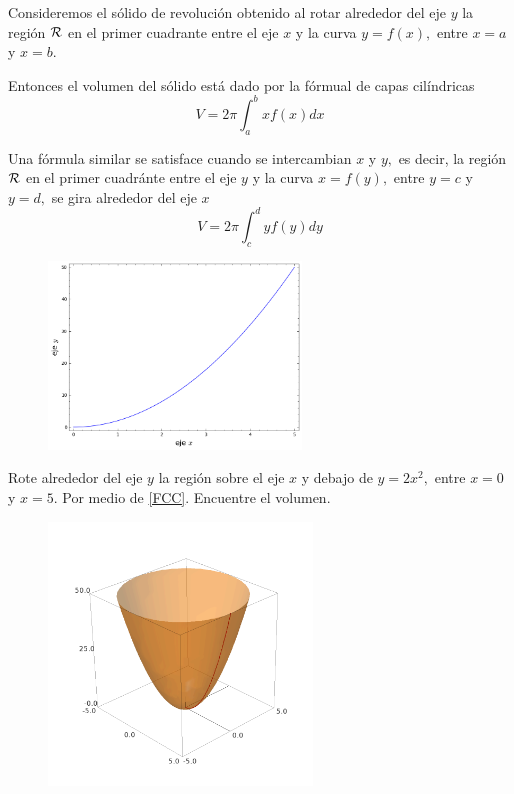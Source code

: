 Consideremos el s\'olido de revoluci\'on obtenido al rotar alrededor del eje $y$ la regi\'on $\mathcal{R}$ en el primer cuadrante entre el eje $x$ y la curva $y=f(x),$ entre $x=a$ y $x=b.$ 

Entonces el volumen del s\'olido está dado por la f\'ormual de capas cil\'indricas
\begin{equation}
 \label{FCC}
 \tag{FCC}
 V=2\pi \int_{a}^{b}xf(x)dx
\end{equation}




Una f\'ormula similar se satisface cuando se intercambian $x$ y $y,$ es decir, la regi\'on $\mathcal{R}$ en el primer cuadránte entre el eje $y$ y la curva $x=f(y),$ entre $y=c$ y $y=d,$ se gira alrededor del eje $x$
\begin{equation}
 \label{FCC:2}
 \tag{FCC(II)}
 V=2\pi \int_{c}^{d}yf(y)dy
\end{equation}



\begin{problema}
\begin{figure}
 \centering
 \includegraphics[height=5cm,keepaspectratio=true]{./calculo/sage0505.png}
 \label{fig:sage:0505}
\end{figure}

Rote alrededor del eje $y$ la regi\'on sobre el eje $x$ y debajo de $y=2x^{2},$ entre $x=0$ y $x=5.$ Por medio de \eqref{FCC}. Encuentre el volumen.
\end{problema}



\begin{figure}[h]
 \centering
 \includegraphics[height=7cm,keepaspectratio=true]{./calculo/sage0506.png}
 \label{fig:sage:0506}
\end{figure}



